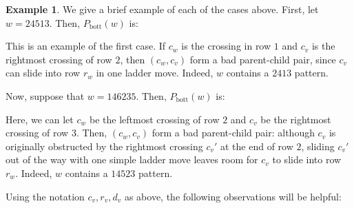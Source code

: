 \documentclass{article}
\newcommand{\cross}[2]{
\begin{scope}[xshift=#1cm,yshift=-#2cm]
\draw[very thick] (0,-0.5) -- (0.45,-0.5);
\draw[very thick] (0.55,-0.5) -- (1,-0.5);
    \draw[very thick] (0.5,0) -- (0.5,-1);
\end{scope}
}%
\newcommand{\arcs}[2]{
\begin{scope}[xshift=#1cm,yshift=-#2cm]
    \draw[very thick] (0,-0.5) arc (-90:0:0.5cm);
    \draw[very thick] (0.5,-1) arc (180:90:0.5cm);
\end{scope}
}%
\newcommand{\GRIDwitnum}[1]{
\begin{scope}
\foreach \n in {1,...,#1} \node at (\n-0.5,0.5){$\bm{\mathsf{\n}}$};
\foreach \n in {1,...,#1} \node at (-0.5,-\n+0.5){$\bm{\mathsf{\n}}$};
\draw[black!25!white] (0,-#1cm) |- (#1cm,0);
\foreach \n in {0,...,{#1}} \draw[black!25!white] (\n+1,0) -- (\n+1,\n-#1);
\foreach \n in {0,...,{#1}} \draw[black!25!white] (0,-\n-1) -- (#1-\n,-\n-1);
\foreach \n in {1,...,{#1}} \draw[very thick] (\n-1,-#1+\n-0.5) arc (-90:0:0.5cm);
\end{scope}
} %
\theoremstyle{definition} %
\newtheorem{example}[theorem]{Example}
\begin{document}
\begin{example}
    We give a brief example of each of the cases above. First, let $w = 24513$. Then, $P_{\text{bott}}(w)$ is:  

    \begin{center}
\end{center}

This is an example of the first case. If $c_w$ is the crossing in row $1$ and $c_v$ is the rightmost crossing of row $2$, then $(c_w, c_v)$ form a bad parent-child pair, since $c_v$ can slide into row $r_w$ in one ladder move. Indeed, $w$ contains a $2413$ pattern. 

Now, suppose that $w = 146235$. Then, $P_{\text{bott}}(w)$ is: 

\begin{center}
\end{center}

Here, we can let $c_w$ be the leftmost crossing of row $2$ and $c_v$ be the rightmost crossing of row $3$. Then, $(c_w, c_v)$ form a bad parent-child pair: although $c_v$ is originally obstructed by the rightmost crossing $c_v'$ at the end of row $2$, sliding $c_v'$ out of the way with one simple ladder move leaves room for $c_v$ to slide into row $r_w$. Indeed, $w$ contains a $14523$ pattern. 

\end{example}

Using the notation $c_v, r_v, d_v$ as above, the following observations will be helpful:
\vspace{1em}
\end{document}
